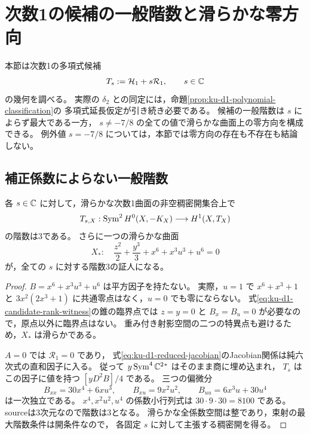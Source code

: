 \section{次数1の候補の一般階数と滑らかな零方向}
\label{sec:ku-d1-candidate-geometry}

本節は次数1の多項式候補
\[
                    T_s:=\mathcal H_1+s\mathcal R_1,
                    \qquad s\in\mathbb C
\]
の幾何を調べる。
実際の $\delta_2$ との同定には，命題\ref{prop:ku-d1-polynomial-classification}の
多項式延長仮定が引き続き必要である。
候補の一般階数は $s$ によらず最大である一方，
$s\ne-7/8$ の全ての値で滑らかな曲面上の零方向を構成できる。
例外値 $s=-7/8$ については，本節では零方向の存在も不存在も結論しない。

\subsection{補正係数によらない一般階数}

\begin{proposition}[次数1の候補の一般階数3]
\label{prop:ku-d1-candidate-generic-rank}
各 $s\in\mathbb C$ に対して，滑らかな次数1曲面の非空稠密開集合上で
\[
               T_{s,X}:\operatorname{Sym}^2H^0(X,-K_X)\longrightarrow H^1(X,T_X)
\]
の階数は3である。
さらに一つの滑らかな曲面
\begin{equation}\label{eq:ku-d1-candidate-rank-witness}
 X_*:\quad \frac{z^2}{2}+\frac{y^3}{3}
                     +x^6+x^3u^3+u^6=0
\end{equation}
が，全ての $s$ に対する階数3の証人になる。
\end{proposition}
\begin{proof}
$B=x^6+x^3u^3+u^6$ は平方因子を持たない。
実際，$u=1$ で $x^6+x^3+1$ と
$3x^2(2x^3+1)$ に共通零点はなく，$u=0$ でも零にならない。
式\eqref{eq:ku-d1-candidate-rank-witness}の錐の臨界点では
$z=y=0$ と $B_x=B_u=0$ が必要なので，原点以外に臨界点はない。
重み付き射影空間の二つの特異点も避けるため，$X_*$ は滑らかである。

$A=0$ では $\mathcal R_1=0$ であり，
式\eqref{eq:ku-d1-reduced-jacobian}のJacobian関係は純六次式の直和因子に入る。
従って $y\operatorname{Sym}^4\mathbb C^2{}^*$ はそのまま商に埋め込まれ，
$T_s$ はこの因子に値を持つ $[yD^2B]/4$ である。
三つの偏微分
\[
 B_{xx}=30x^4+6xu^3,\qquad B_{xu}=9x^2u^2,
 \qquad B_{uu}=6x^3u+30u^4
\]
は一次独立である。
$x^4,x^2u^2,u^4$ の係数小行列式は $30\cdot9\cdot30=8100$ である。
sourceは3次元なので階数は3となる。
滑らかな全係数空間は整であり，束射の最大階数条件は開条件なので，
各固定 $s$ に対して主張する稠密開を得る。
\end{proof}

